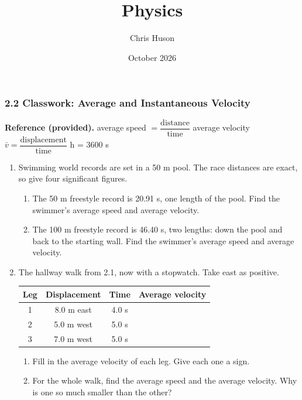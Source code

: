 \documentclass[12pt, twoside]{article}
\title{Physics}
\author{Chris Huson}
\date{October 2026}
\begin{document}
\subsubsection*{2.2 Classwork: Average and Instantaneous Velocity}

\textbf{Reference (provided).} \quad
average speed $= \dfrac{\text{distance}}{\text{time}}$ \quad
average velocity $\bar{v} = \dfrac{\text{displacement}}{\text{time}}$
 h = 3600 s

\vspace{0.2cm}

\begin{enumerate}[itemsep=0.5cm]

\item Swimming world records are set in a 50 m pool. The race distances are exact,
  so give four significant figures.
  \begin{enumerate}[itemsep=1.1cm]
    \item The 50 m freestyle record is 20.91 s, one length of the pool. Find the
      swimmer's average speed and average velocity.
    \item The 100 m freestyle record is 46.40 s, two lengths: down the pool and back
      to the starting wall. Find the swimmer's average speed and average velocity.
  \end{enumerate}
  \vspace{1.0cm}

\item The hallway walk from 2.1, now with a stopwatch. Take east as positive.

  \begin{center}
  \renewcommand{\arraystretch}{1.35}
  \begin{tabular}{| c | c | c | p{4.2cm} |}
    \hline
    Leg & Displacement & Time & Average velocity \\ \hline
    1 & 8.0 m east & 4.0 s & \\ \hline
    2 & 5.0 m west & 5.0 s & \\ \hline
    3 & 7.0 m west & 5.0 s & \\ \hline
  \end{tabular}
  \end{center}

  \begin{enumerate}[itemsep=1.1cm]
    \item Fill in the average velocity of each leg. Give each one a sign.
    \item For the whole walk, find the average speed and the average velocity. Why
      is one so much smaller than the other?
  \end{enumerate}
  \vspace{1.1cm}


\end{enumerate}
\end{document}
